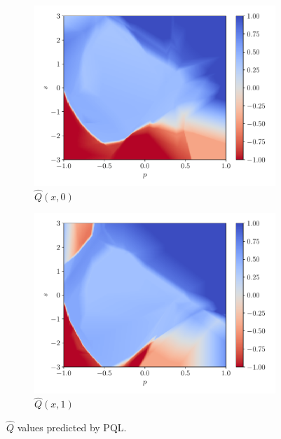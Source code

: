 \documentclass[a4paper, 12pt]{article}
\begin{document}
    \begin{figure}[h]
        \centering
        \begin{subfigure}{0.49\textwidth}
            \centering
            \includegraphics[width=\textwidth]{resources/pdf/previous_PQL_q0.pdf}
            \caption{$\hat{Q}(x, 0)$}
        \end{subfigure}
        \hfill
        \begin{subfigure}{0.49\textwidth}
            \centering
            \includegraphics[width=\textwidth]{resources/pdf/previous_PQL_q1.pdf}
            \caption{$\hat{Q}(x, 1)$}
        \end{subfigure}
        \caption{$\hat{Q}$ values predicted by PQL.}
        \label{fig:q.learning.nn.adam}
    \end{figure}
    
\end{document}

